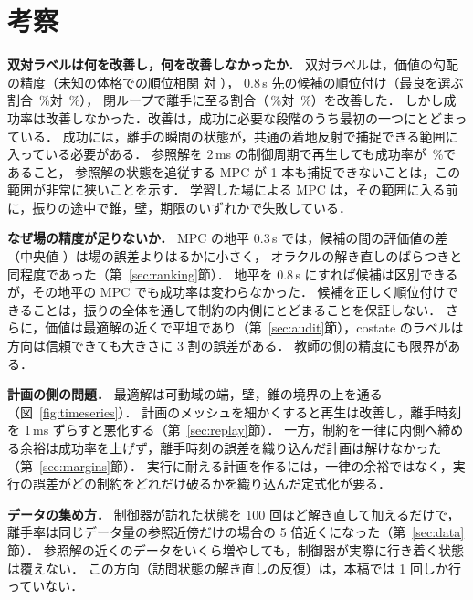 \section{考察}
\label{sec:discussion}
\textbf{双対ラベルは何を改善し，何を改善しなかったか．}
双対ラベルは，価値の勾配の精度（未知の体格での順位相関 \fitSobHoldRho 対 \fitValHoldRho），
0.8\,s 先の候補の順位付け（最良を選ぶ割合 \rankSobLong\,\%対 \rankValLong\,\%），
閉ループで離手に至る割合（\clSmpcRel\,\%対 \clVmpcRel\,\%）を改善した．
しかし成功率は改善しなかった．改善は，成功に必要な段階のうち最初の一つにとどまっている．
成功には，離手の瞬間の状態が，共通の着地反射で捕捉できる範囲に入っている必要がある．
参照解を 2\,ms の制御周期で再生しても成功率が \clReplaySuccInt\,\%であること，
参照解の状態を追従する MPC が 1 本も捕捉できないことは，この範囲が非常に狭いことを示す．
学習した場による MPC は，その範囲に入る前に，振りの途中で錐，壁，期限のいずれかで失敗している．

\textbf{なぜ場の精度が足りないか．}
MPC の地平 0.3\,s では，候補の間の評価値の差（中央値 \spreadShortMed）は場の誤差よりはるかに小さく，
オラクルの解き直しのばらつきと同程度であった（第~\ref{sec:ranking}節）．
地平を 0.8\,s にすれば候補は区別できるが，その地平の MPC でも成功率は変わらなかった．
候補を正しく順位付けできることは，振りの全体を通して制約の内側にとどまることを保証しない．
さらに，価値は最適解の近くで平坦であり（第~\ref{sec:audit}節），costate のラベルは方向は信頼できても大きさに 3 割の誤差がある．
教師の側の精度にも限界がある．

\textbf{計画の側の問題．}
最適解は可動域の端，壁，錐の境界の上を通る（図~\ref{fig:timeseries}）．
計画のメッシュを細かくすると再生は改善し，離手時刻を 1\,ms ずらすと悪化する（第~\ref{sec:replay}節）．
一方，制約を一律に内側へ締める余裕は成功率を上げず，離手時刻の誤差を織り込んだ計画は解けなかった（第~\ref{sec:margins}節）．
実行に耐える計画を作るには，一律の余裕ではなく，実行の誤差がどの制約をどれだけ破るかを織り込んだ定式化が要る．

\textbf{データの集め方．}
制御器が訪れた状態を 100 回ほど解き直して加えるだけで，離手率は同じデータ量の参照近傍だけの場合の 5 倍近くになった（第~\ref{sec:data}節）．
参照解の近くのデータをいくら増やしても，制御器が実際に行き着く状態は覆えない．
この方向（訪問状態の解き直しの反復）は，本稿では 1 回しか行っていない．


